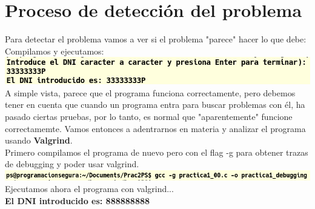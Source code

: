 \section{Proceso de detección del problema}
\noindent Para detectar el problema vamos a ver si el problema "parece" hacer lo que debe:
\\Compilamos y ejecutamos: \\\includegraphics[width=1\textwidth]{mainmatter/Fotos Codigo/simple vista.png}
A simple vista, parece que el programa funciona correctamente, pero debemos tener en cuenta que cuando un programa entra para buscar problemas con él, ha pasado ciertas pruebas, por lo tanto, es normal que "aparentemente" funcione correctamemte. Vamos entonces a adentrarnos en materia y analizar el programa usando \textbf{Valgrind}.
\\
\vspace{0.3cm}
\noindent Primero compilamos el programa de nuevo pero con el flag -g para obtener trazas de debugging y poder usar valgrind.
\\\includegraphics[width=1\textwidth]{mainmatter/Fotos Codigo/captura compilar debugging.png}
\\
Ejecutamos ahora el programa con valgrind...
\\
\textbf{El DNI introducido es: 888888888 }

